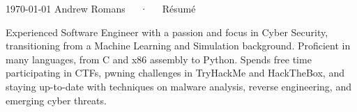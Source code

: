 \documentclass[11pt, a4paper]{awesome-cv}
\begin{document}
\makecvheader[C]

\makecvfooter
  {\today}
  {Andrew Romans~~~·~~~Résumé}
  {\thepage}




\begin{cvparagraph}

Experienced Software Engineer with a passion and focus in Cyber Security, transitioning from a Machine Learning and Simulation background. Proficient in many languages, from C and x86 assembly to Python. Spends free time participating in CTFs, pwning challenges in TryHackMe and HackTheBox, and staying up-to-date with techniques on malware analysis, reverse engineering, and emerging cyber threats.
\end{cvparagraph}

\end{document}
